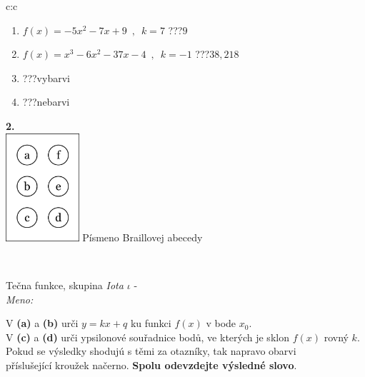 \documentclass[10pt]{report}
\begin{document}
\begin{tabular}{c:c}
\begin{minipage}[c][104.5mm][t]{0.5\linewidth}
\begin{center}
\begin{minipage}{0.79\linewidth}
\begin{center}
\begin{varwidth}{\linewidth}
\begin{enumerate}
\item $f(x)=-5x^2-7x+9\enspace , \enspace k=7$\quad \dotfill\; ???\;\dotfill \quad $9$
\item $f(x)=x^3-6x^2-37x-4\enspace , \enspace k=-1$\quad \dotfill\; ???\;\dotfill \quad $38 , 218$
\item \quad \dotfill\; ???\;\dotfill \quad vybarvi
\item \quad \dotfill\; ???\;\dotfill \quad nebarvi
\end{enumerate}
\end{varwidth}
\end{center}
\end{minipage}
\begin{minipage}{0.20\linewidth}
\begin{center}
{\Huge\bfseries 2.} \\[2mm]
\includegraphics[height=40mm]{../images/braille.png}
{\small Písmeno Braillovej abecedy}
\end{center}
\end{minipage}
\end{center}
\end{minipage}
\\ \hdashline
\begin{minipage}[c][104.5mm][t]{0.5\linewidth}
\begin{center}
\vspace{7mm}
{\huge Tečna funkce, skupina \textit{Iota $\iota$} -}\\[5mm]
\textit{Meno:}\phantom{xxxxxxxxxxxxxxxxxxxxxxxxxxxxxxxxxxxxxxxxxxxxxxxxxxxxxxxxxxxxxxxxx}\\[5mm]
\begin{minipage}{0.95\linewidth}
\begin{center}
V \textbf{(a)} a \textbf{(b)} urči  $y = kx + q$ ku funkci $f(x)$ v bode $x_0$.\\V \textbf{(c)} a \textbf{(d)} urči ypsilonové souřadnice bodů, ve kterých je sklon $f(x)$ rovný $k$.\\Pokud se výsledky shodujú s těmi za otazníky, tak napravo obarvi\\příslušející kroužek načerno. \textbf{Spolu odevzdejte výsledné slovo}.

\end{center}
\end{minipage}
\end{center}
\end{minipage}
\end{tabular}
\end{document}
